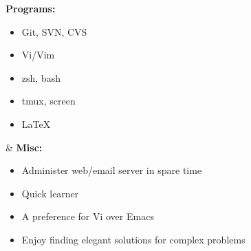 \documentclass[11pt]{res}
\begin{document}
\begin{resume}
\begin{ncolumn}{2}
  {\bf Programs:}
  \begin{itemize}
  \item Git, SVN, CVS
  \item Vi/Vim
  \item zsh, bash
  \item tmux, screen
  \item \LaTeX
  \end{itemize}
&
  {\bf Misc:}
  \begin{itemize}
  \item Administer web/email server in spare time
  \item Quick learner
  \item A preference for Vi over Emacs
  \item Enjoy finding elegant solutions for complex problems
  \end{itemize}
\end{ncolumn}


\end{resume}
\end{document}
